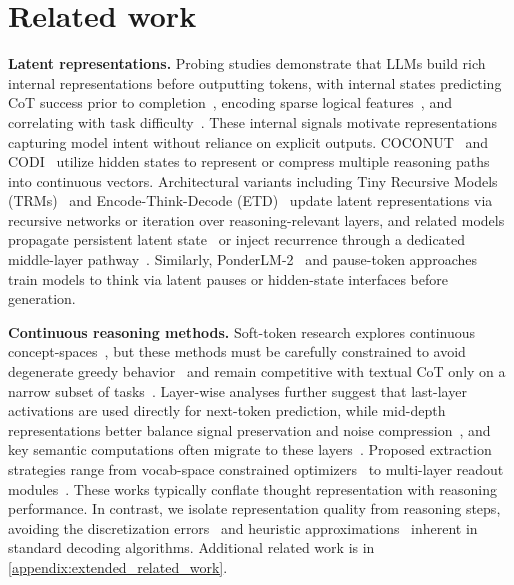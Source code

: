 \section{Related work}
\label{related work}

\textbf{Latent representations.} Probing studies demonstrate that LLMs build rich internal representations before outputting tokens, with internal states predicting CoT success prior to completion~\citep{afzal2025knowingsayingllmrepresentations, lugoloobi2026llms}, encoding sparse logical features~\citep{helff2026activationreasoning}, and correlating with task difficulty~\citep{herrmann2025measuring}. These internal signals motivate representations capturing model intent without reliance on explicit outputs. COCONUT~\citep{hao2024training} and CODI~\citep{shen2025codicompressingchainofthoughtcontinuous} utilize hidden states to represent or compress multiple reasoning paths into continuous vectors. Architectural variants including Tiny Recursive Models (TRMs)~\citep{jolicoeurmartineau2025morerecursivereasoningtiny, wang2026tiny} and Encode-Think-Decode (ETD)~\citep{koishekenov2025encodethinkdecodescaling} update latent representations via recursive networks or iteration over reasoning-relevant layers, and related models propagate persistent latent state~\citep{li2026learning} or inject recurrence through a dedicated middle-layer pathway~\citep{cai2026tmlr}. Similarly, PonderLM-2~\citep{zeng2025ponderlm2pretrainingllmlatent} and pause-token approaches~\citep{goyal2024thinkspeaktraininglanguage} train models to think via latent pauses or hidden-state interfaces before generation.

\textbf{Continuous reasoning methods.} Soft-token research explores continuous concept-spaces~\citep{zhang2025softthinkingunlockingreasoning, sheshanarayana2026thinking}, but these methods must be carefully constrained to avoid degenerate greedy behavior~\citep{wu2026llms, butt2026soft} and remain competitive with textual CoT only on a narrow subset of tasks~\citep{ye2026latentchem}. Layer-wise analyses further suggest that last-layer activations are used directly for next-token prediction, while mid-depth representations better balance signal preservation and noise compression~\citep{skean2025layerlayeruncoveringhidden, shani2025tokensthoughtsllmshumans}, and key semantic computations often migrate to these layers~\citep{wendler-etal-2024-llamas}. Proposed extraction strategies range from vocab-space constrained optimizers~\citep{deng2025latentreasoningllmsvocabularyspace} to multi-layer readout modules~\citep{chételat2025innerthoughtsdisentanglingrepresentationspredictions}. These works typically conflate thought representation with reasoning performance. In contrast, we isolate representation quality from reasoning steps, avoiding the discretization errors~\citep{hao2024training} and heuristic approximations~\citep{holtzman2020curiouscaseneuraltext} inherent in standard decoding algorithms. Additional related work is in \cref{appendix:extended_related_work}.
